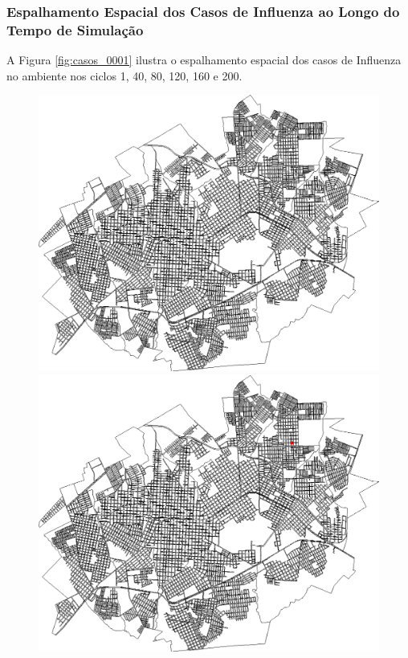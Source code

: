 \newpage

\subsubsection{Espalhamento Espacial dos Casos de Influenza ao Longo do Tempo de Simulação}

A Figura \ref{fig:casos_0001} ilustra o espalhamento espacial dos casos de Influenza no ambiente nos ciclos 1, 40, 80, 120, 160 e 200.

\begin{figure}[H]
  \centering
  \begin{minipage}{.5\textwidth}
    \centering
    \includegraphics[width=1.0\textwidth]{Figuras/Resultados/0001/Saidas_GPU_BIT/MonteCarlo_0/Simulacao_0/Casos/00000.png}
    \captionsetup{labelformat=empty}
  \end{minipage}%
  \begin{minipage}{.5\textwidth}
    \centering
    \includegraphics[width=1.0\textwidth]{Figuras/Resultados/0001/Saidas_GPU_BIT/MonteCarlo_0/Simulacao_0/Casos/00040.png}

\end{minipage}
\end{figure}
